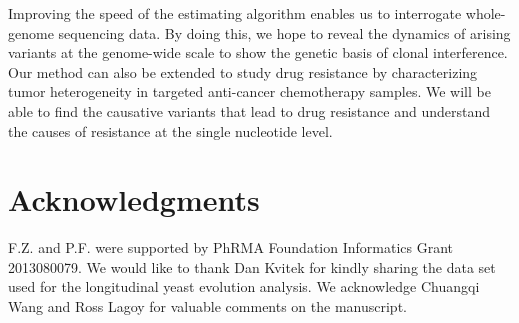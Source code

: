\documentclass[11pt,reqno]{amsart}
\begin{document}

Improving the speed of the estimating algorithm enables us to interrogate whole-genome sequencing data.
By doing this, we hope to reveal the dynamics of arising variants at the genome-wide scale to show the genetic basis of clonal interference.
Our method can also be extended to study drug resistance by characterizing tumor heterogeneity in targeted anti-cancer chemotherapy samples.
We will be able to find the causative variants that lead to drug resistance and understand the causes of resistance at the single nucleotide level.


\section{Acknowledgments}
F.Z. and P.F. were supported by PhRMA Foundation Informatics Grant 2013080079.
We would like to thank Dan Kvitek for kindly sharing the data set used for the longitudinal yeast evolution analysis.
We acknowledge Chuangqi Wang and Ross Lagoy for valuable comments on the manuscript.
%
\appendix
\end{document}
